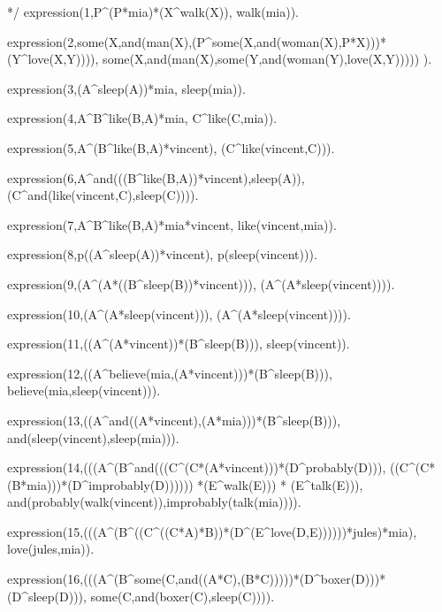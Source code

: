 \documentclass{book}[9pt]
\newenvironment{code}%
{\small \verbatim}%
{\endverbatim \large}
\begin{document}
\begin{code}
*/
expression(1,P^(P*mia)*(X^walk(X)),
           walk(mia)).

expression(2,some(X,and(man(X),(P^some(X,and(woman(X),P*X)))*(Y^love(X,Y)))),
           some(X,and(man(X),some(Y,and(woman(Y),love(X,Y))))) ).

expression(3,(A^sleep(A))*mia,
           sleep(mia)).

expression(4,A^B^like(B,A)*mia,
           C^like(C,mia)).

expression(5,A^(B^like(B,A)*vincent),
           (C^like(vincent,C))).

expression(6,A^and(((B^like(B,A))*vincent),sleep(A)),
           (C^and(like(vincent,C),sleep(C)))).

expression(7,A^B^like(B,A)*mia*vincent,
           like(vincent,mia)).

expression(8,p((A^sleep(A))*vincent),
           p(sleep(vincent))).

expression(9,(A^(A*((B^sleep(B))*vincent))),
           (A^(A*sleep(vincent)))).

expression(10,(A^(A*sleep(vincent))),
           (A^(A*sleep(vincent)))).

expression(11,((A^(A*vincent))*(B^sleep(B))),
           sleep(vincent)).

expression(12,((A^believe(mia,(A*vincent)))*(B^sleep(B))),
           believe(mia,sleep(vincent))).

expression(13,((A^and((A*vincent),(A*mia)))*(B^sleep(B))),
           and(sleep(vincent),sleep(mia))).

expression(14,(((A^(B^and(((C^(C*(A*vincent)))*(D^probably(D))),
                          ((C^(C*(B*mia)))*(D^improbably(D))))))
               *(E^walk(E))) *
              (E^talk(E))),
           and(probably(walk(vincent)),improbably(talk(mia)))).

expression(15,(((A^(B^((C^((C*A)*B))*(D^(E^love(D,E))))))*jules)*mia),
           love(jules,mia)).

expression(16,(((A^(B^some(C,and((A*C),(B*C)))))*(D^boxer(D)))*(D^sleep(D))),
           some(C,and(boxer(C),sleep(C)))).


\end{code}
\end{document}
